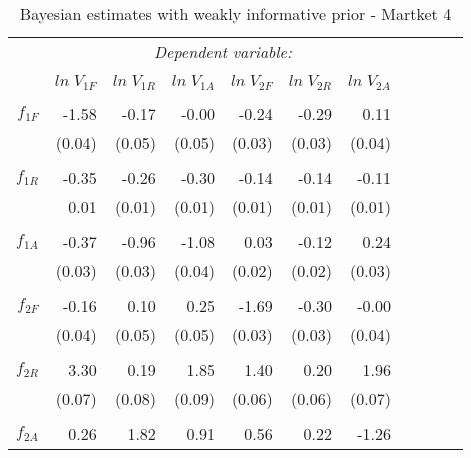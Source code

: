 \begin{table}[ht]
\caption{Bayesian estimates with weakly informative prior - Martket 4}
\centering
\begin{tabular}{rrrrrrrrrrr}
  \toprule 
 & \multicolumn{6}{c}{\textit{Dependent variable:}} \\ 
\cline{2-7} 
\\[-1.8ex] & $ln \; V_{1F}$ & $ln \; V_{1R}$ & $ln \; V_{1A}$ &  $ln \; V_{2F}$ & $ln \; V_{2R}$ & $ln \; V_{2A}$ \\ 
\hline \\[-1.8ex] 
  $f_{1F}$ & -1.58 & -0.17 & -0.00 & -0.24 & -0.29 & 0.11 \\
           & (0.04) & (0.05) & (0.05) & (0.03) & (0.03) & (0.04) \\
& & \\
  $f_{1R}$ & -0.35 & -0.26 & -0.30 & -0.14 & -0.14 & -0.11 \\
           & 0.01 & (0.01) & (0.01) & (0.01) & (0.01) & (0.01) \\
& & \\
  $f_{1A}$ & -0.37 & -0.96 & -1.08 & 0.03 & -0.12 & 0.24 \\
           & (0.03) & (0.03) & (0.04) & (0.02) & (0.02) & (0.03) \\
& & \\
  $f_{2F}$ & -0.16 & 0.10 & 0.25 & -1.69 & -0.30 & -0.00 \\
  		     & (0.04) & (0.05) & (0.05) & (0.03) & (0.03) & (0.04) \\
& & \\
  $f_{2R}$ & 3.30 & 0.19 & 1.85 & 1.40 & 0.20 & 1.96 \\
  			   & (0.07) & (0.08) & (0.09) & (0.06) & (0.06) & (0.07) \\
& & \\  
  $f_{2A}$ & 0.26 & 1.82 & 0.91 & 0.56 & 0.22 & -1.26 \\

\end{tabular}
\end{table}
